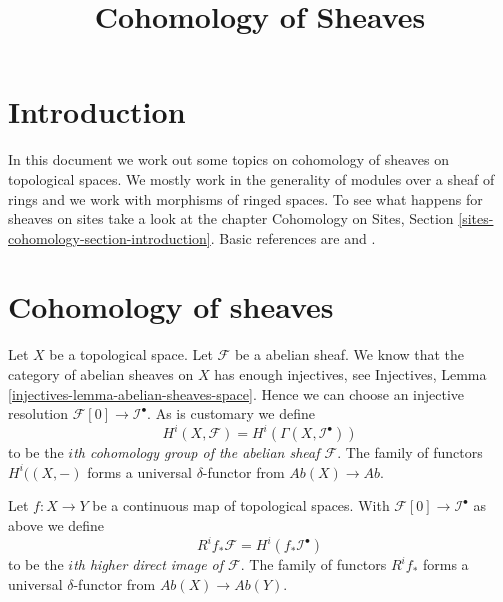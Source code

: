 

%


\title{Cohomology of Sheaves}


\maketitle

\label{section-phantom}

\tableofcontents

\section{Introduction}
\label{section-introduction}

\noindent
In this document we work out some topics on cohomology of sheaves
on topological spaces. We mostly work in the generality of modules
over a sheaf of rings and we work with morphisms of ringed spaces.
To see what happens for sheaves on sites take a look at the chapter
Cohomology on Sites, Section \ref{sites-cohomology-section-introduction}.
Basic references are \cite{Godement} and \cite{Iversen}.





\section{Cohomology of sheaves}
\label{section-cohomology-sheaves}

\noindent
Let $X$ be a topological space. Let $\mathcal{F}$ be a abelian sheaf.
We know that the category of abelian sheaves on $X$ has enough injectives, see
Injectives, Lemma \ref{injectives-lemma-abelian-sheaves-space}.
Hence we can choose an injective resolution
$\mathcal{F}[0] \to \mathcal{I}^\bullet$. As is customary we define
\begin{equation}
\label{equation-cohomology}
H^i(X, \mathcal{F}) = H^i(\Gamma(X, \mathcal{I}^\bullet))
\end{equation}
to be the {\it $i$th cohomology group of the abelian sheaf $\mathcal{F}$}.
The family of functors $H^i((X, -)$ forms a universal $\delta$-functor
from $\textit{Ab}(X) \to \textit{Ab}$.

\medskip\noindent
Let $f : X \to Y$ be a continuous map of topological spaces. With
$\mathcal{F}[0] \to \mathcal{I}^\bullet$ as above
we define
\begin{equation}
\label{equation-higher-direct-image}
R^if_*\mathcal{F} = H^i(f_*\mathcal{I}^\bullet)
\end{equation}
to be the {\it $i$th higher direct image of $\mathcal{F}$}.
The family of functors $R^if_*$ forms a universal $\delta$-functor
from $\textit{Ab}(X) \to \textit{Ab}(Y)$.

